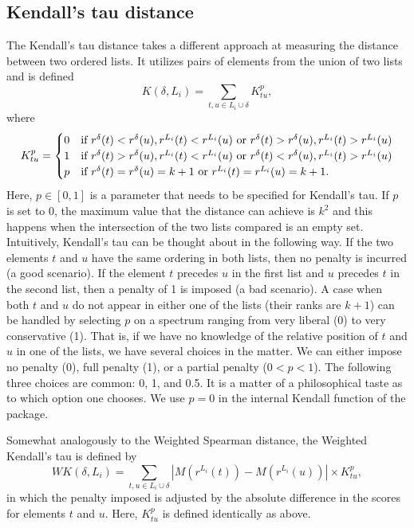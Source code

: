 \documentclass[11pt]{article}
\begin{document}
\subsection{Kendall's tau distance}

    The Kendall's tau distance takes a different approach at measuring the distance between two ordered lists. 
    It utilizes pairs of elements from the union of two lists and is defined
    $$
    K(\delta, L_i)=\sum_{t,u \in L_i \cup \delta} K^p_{tu},
    $$
    where
    $$
    K^p_{tu} =
    \begin{cases}
    0 & \textnormal{if $r^\delta(t)<r^\delta(u),r^{L_i}(t)<r^{L_i}(u)$ or
    $r^\delta(t)>r^\delta(u),r^{L_i}(t)>r^{L_i}(u)$} \\
    1 & \textnormal{if $r^\delta(t)>r^\delta(u),r^{L_i}(t)<r^{L_i}(u)$ or
    $r^\delta(t)<r^\delta(u),r^{L_i}(t)>r^{L_i}(u)$} \\
    p & \textnormal{if $r^\delta(t)=r^\delta(u)=k+1$ or $r^{L_i}(t)=r^{L_i}(u)=k+1$}.
    \end{cases}
    $$
    Here, $p \in [0,1]$ is a parameter that needs to be specified for Kendall's tau. If $p$ is set to 0,
    the maximum value that the distance can achieve is $k^2$ and
    this happens when the intersection of the two lists compared is an empty set. Intuitively, Kendall's
    tau can be thought about in the following way. If the two elements $t$ and $u$ have the same ordering in
    both lists, then no penalty is incurred (a good scenario). If the element $t$ precedes $u$ in the first list
    and $u$ precedes $t$ in the second list, then a penalty of 1 is imposed (a bad scenario). A case when both
    $t$ and $u$ do not appear in either one of the lists (their ranks are $k+1$) can be handled by selecting $p$
    on a spectrum ranging from very liberal (0) to very conservative (1). That is, if we have no knowledge of the
    relative position of $t$ and $u$ in one of the lists, we have several choices in the matter. We can either
    impose no penalty (0), full penalty (1), or a partial penalty ($0 < p < 1$). The following three choices are
    common: 0, 1, and 0.5. It is a matter of a philosophical taste as to which option one chooses. We use $p=0$ in
    the internal Kendall function of the package.

    Somewhat analogously to the Weighted Spearman distance, the Weighted Kendall's tau is defined by
    $$
    WK(\delta, L_i)=\sum_{t,u \in L_i \cup \delta} |M(r^{L_i}(t))-M(r^{L_i}(u))|\times K^p_{tu},
    $$
    in which the penalty imposed is adjusted by the absolute difference in the scores for elements $t$ and $u$.
    Here, $K^p_{tu}$ is defined identically as above.
    
\end{document}
